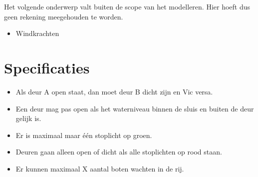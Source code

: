 \documentclass{article}
\begin{document}
Het volgende onderwerp valt buiten de scope van het modelleren. Hier hoeft dus geen rekening meegehouden te worden.
\begin{itemize}
\item Windkrachten
\end{itemize}

\section{Specificaties} %

\begin{itemize}

\item Als deur A open staat, dan moet deur B dicht zijn en Vic versa.

\item Een deur mag pas open als het waterniveau binnen de sluis en buiten de deur gelijk is.

\item Er is maximaal maar één stoplicht op groen.

\item Deuren gaan alleen open of dicht als alle stoplichten op rood staan.

\item Er kunnen maximaal X aantal boten wachten in de rij.
\end{itemize}

\vskip2cm

\clearpage %
\end{document}
